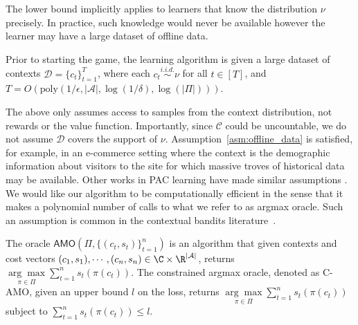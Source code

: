 \documentclass{article}
\newcommand{\mc}[1]{\mathcal{#1}}
\newcommand{\1}{\mathbf{1}}
\begin{document}
The lower bound implicitly applies to learners that know the distribution $\nu$ precisely.
In practice, such knowledge would never be available however the learner may have a large dataset of offline data.
\begin{assumption}\label{asm:offline_data}
Prior to starting the game, the learning algorithm is given a large dataset of contexts $\mc{D} = \{c_t\}_{t=1}^T$, where each $c_t\overset{i.i.d.}{\sim}\nu$ for all $t \in [T]$, and $T = O(\text{poly}(1/\epsilon,|\mc{A}|,\log(1/\delta),\log(|\Pi|)))$.
\end{assumption}
\noindent The above only assumes access to samples from the context distribution, not rewards or the value function. 
Importantly, since $\mc{C}$ could be uncountable, we do not assume $\mc{D}$ covers the support of $\nu$. 
Assumption~\ref{asm:offline_data} is satisfied, for example, in an e-commerce setting where the context is the demographic information about visitors to the site for which massive troves of historical data may be available.
Other works in PAC learning have made similar assumptions \cite{huang2015efficient}.
We would like our algorithm to be computationally efficient in the sense that it makes a polynomial number of calls to what we refer to as argmax oracle. Such an assumption is common in the contextual bandits literature~\cite{agarwal2014taming,krishnamurthy2017active, dudik2011efficient}.

\begin{definition}\label{def:csc}
 The oracle $\textsf{AMO}(\Pi, \{(c_t, s_t)\}_{t=1}^n)$ is an algorithm that given contexts and cost vectors $(c_1,s_1), \cdots, (c_n,s_n)\in\C\times \R^{|\mc{A}|}$, returns $\underset{\pi \in \Pi}{\arg\max} \sum_{t=1}^{n} s_t\left(\pi\left(c_t\right)\right)$. The constrained argmax oracle, denoted as \textsf{C-AMO}, given an upper bound $l$ on the loss, returns $\underset{\pi \in \Pi}{\arg\max} \sum_{t=1}^{n} s_t\left(\pi\left(c_t\right)\right)$ subject to $\sum_{t=1}^{n} s_t\left(\pi\left(c_t\right)\right)\leq l$.
\end{definition}
\end{document}
